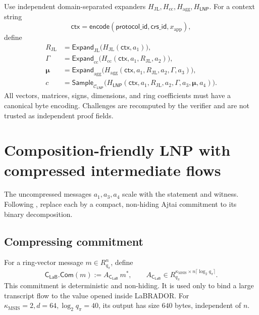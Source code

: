 \documentclass[11pt,a4paper]{article}
\newcommand{\Rpi}{R_{q_{\pi}}}
\newcommand{\proofmod}{q_{\pi}}
\newcommand{\LNP}{\mathsf{LNP}}
\newcommand{\Com}{\mathsf{Com}}
\newcommand{\CLaB}{\mathsf{C}_{\mathsf{LaB}}}
\newcommand{\calC}{\mathcal{C}}
\begin{document}
Use independent domain-separated expanders
\(H_{\mathrm{JL}},H_{\mathrm{cc}},H_{\mathrm{agg}},H_{\LNP}\).  For a context
string
\[
  \mathsf{ctx}=\mathsf{encode}(\mathsf{protocol\_id},\mathsf{crs\_id},x_{\mathrm{app}}),
\]
define
\begin{align*}
 R_{\mathrm{JL}}
   &=\mathsf{Expand}_{\mathrm{JL}}
     \bigl(H_{\mathrm{JL}}(\mathsf{ctx},a_1)\bigr),\\
 \Gamma
   &=\mathsf{Expand}_{\mathrm{cc}}
     \bigl(H_{\mathrm{cc}}(\mathsf{ctx},a_1,R_{\mathrm{JL}},a_2)\bigr),\\
 \boldsymbol\mu
   &=\mathsf{Expand}_{\mathrm{agg}}
     \bigl(H_{\mathrm{agg}}(\mathsf{ctx},a_1,R_{\mathrm{JL}},a_2,
       \Gamma,a_3)\bigr),\\
 c
   &=\mathsf{Sample}_{\calC_{\LNP}}
     \bigl(H_{\LNP}(\mathsf{ctx},a_1,R_{\mathrm{JL}},a_2,
       \Gamma,a_3,\boldsymbol\mu,a_4)\bigr).
\end{align*}
All vectors, matrices, signs, dimensions, and ring coefficients must have a
canonical byte encoding.  Challenges are recomputed by the verifier and are
not trusted as independent proof fields.

\section{Composition-friendly LNP with compressed intermediate flows}

The uncompressed messages \(a_1,a_3,a_4\) scale with the statement and witness.
Following \cite{DPKNRT25}, replace each by a compact, non-hiding Ajtai
commitment to its binary decomposition.

\subsection{Compressing commitment}

For a ring-vector message \(m\in\Rpi^n\), define
\begin{equation}
  \CLaB.\Com(m):=A_{\CLaB}\,m^*,
  \qquad
  A_{\CLaB}\in\Rpi^{\kappa_{\mathrm{MSIS}}\times n\lceil\log_2\proofmod\rceil}.
  \label{eq:CLaB}
\end{equation}
This commitment is deterministic and non-hiding.  It is used only to bind a
large transcript flow to the value opened inside LaBRADOR.  For
\(\kappa_{\mathrm{MSIS}}=2,d=64,\log_2\proofmod=40\), its output has size
\(640\) bytes, independent of \(n\).
\end{document}
